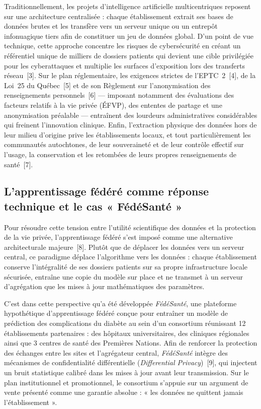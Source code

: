 Traditionnellement, les projets d’intelligence artificielle multicentriques reposent sur une architecture centralisée : chaque établissement extrait ses bases de données brutes et les transfère vers un serveur unique ou un entrepôt infonuagique tiers afin de constituer un jeu de données global. D’un point de vue technique, cette approche concentre les risques de cybersécurité en créant un référentiel unique de milliers de dossiers patients qui devient une cible privilégiée pour les cyberattaques et multiplie les surfaces d’exposition lors des transferts réseau~[3]. Sur le plan réglementaire, les exigences strictes de l’EPTC~2~[4], de la Loi~25 du Québec~[5] et de son Règlement sur l’anonymisation des renseignements personnels~[6] --- imposant notamment des évaluations des facteurs relatifs à la vie privée (ÉFVP), des ententes de partage et une anonymisation préalable --- entraînent des lourdeurs administratives considérables qui freinent l’innovation clinique. Enfin, l’extraction physique des données hors de leur milieu d’origine prive les établissements locaux, et tout particulièrement les communautés autochtones, de leur souveraineté et de leur contrôle effectif sur l’usage, la conservation et les retombées de leurs propres renseignements de santé~[7].

\subsection{L’apprentissage fédéré comme réponse technique et le cas « FédéSanté »}

Pour résoudre cette tension entre l’utilité scientifique des données et la protection de la vie privée, l’apprentissage fédéré s’est imposé comme une alternative architecturale majeure~[8]. Plutôt que de déplacer les données vers un serveur central, ce paradigme déplace l’algorithme vers les données : chaque établissement conserve l’intégralité de ses dossiers patients sur sa propre infrastructure locale sécurisée, entraîne une copie du modèle sur place et ne transmet à un serveur d’agrégation que les mises à jour mathématiques des paramètres.

C’est dans cette perspective qu’a été développée \emph{FédéSanté}, une plateforme hypothétique d’apprentissage fédéré conçue pour entraîner un modèle de prédiction des complications du diabète au sein d’un consortium réunissant 12 établissements partenaires : des hôpitaux universitaires, des cliniques régionales ainsi que 3 centres de santé des Premières Nations. Afin de renforcer la protection des échanges entre les sites et l’agrégateur central, \emph{FédéSanté} intègre des mécanismes de confidentialité différentielle (\emph{Differential Privacy})~[9], qui injectent un bruit statistique calibré dans les mises à jour avant leur transmission. Sur le plan institutionnel et promotionnel, le consortium s’appuie sur un argument de vente présenté comme une garantie absolue : « les données ne quittent jamais l’établissement ».

